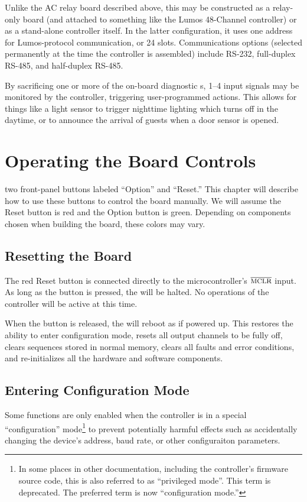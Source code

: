 \documentclass[letterpaper,twoside,onecolumn,openright,final]{memoir}
\begin{document}
Unlike the AC relay board described above, this may be constructed as a relay-only board (and attached
to something like the Lumos 48-Channel controller) or as a stand-alone controller itself.  In the latter
configuration, it uses one address for Lumos-protocol communication, or 24  slots.
Communications options (selected permanently at the time the controller is assembled) include
RS-232, full-duplex RS-485, and half-duplex RS-485.

By sacrificing one or more of the on-board diagnostic s, 1--4 input signals may be 
monitored by the controller, triggering user-programmed actions.  This allows for things like
a light sensor to trigger nighttime lighting which turns off in the daytime, or to announce the
arrival of guests when a door sensor is opened.


\chapter{Operating the Board Controls}
 two front-panel buttons labeled ``Option'' and ``Reset.''
This chapter will describe how to use these buttons to control the board manually.  We will assume the
Reset button is red and the Option button is green.  Depending on components chosen when building the
board, these colors may vary.

\section{Resetting the Board}
The red Reset button is connected directly to the microcontroller's $\overline{\hbox{\mc{MCLR}}}$ input.
As long as the button is pressed, the  will be halted.  No operations of the controller
will be active at this time.  

When the button is released, the  will reboot as if powered up.  This restores the ability
to enter configuration mode, resets all output channels to be fully off, clears sequences stored in
normal  memory, clears all faults and error conditions, and re-initializes all the hardware
and software components.

\section{Entering Configuration Mode}\label{sec:configmode}
Some functions are only enabled when the controller is in a special ``configuration'' mode\footnote{In
some places in other documentation, including the controller's firmware source code, this is also
referred to as ``privileged mode''.  This term is deprecated. The preferred term is now
``configuration mode.''} to prevent potentially harmful effects such as accidentally changing
the device's address, baud rate, or other configuraiton parameters.
\end{document}
